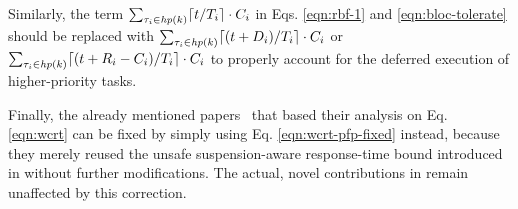 Similarly, the term $\sum_{\tau_i \in \mathit{hp}(k)} \lceil t / T_i \rceil \cdot C_i$ in Eqs. \eqref{eqn:rbf-1} and \eqref{eqn:bloc-tolerate} should be replaced with $\sum_{\tau_i \in \mathit{hp}(k)} \lceil (t+D_i) / T_i \rceil \cdot C_i$ or $\sum_{\tau_i \in \mathit{hp}(k)} \lceil (t+R_i-C_i) / T_i \rceil \cdot C_i$ to properly account for the deferred execution of higher-priority tasks.

Finally, the already mentioned papers~\cite{zeng-2011,bbb-2013,yang-2013,kim-2014,han-2014,carminati-2014,yang-2014} that based their analysis on Eq. \eqref{eqn:wcrt} can be fixed by simply using Eq. \eqref{eqn:wcrt-pfp-fixed} instead, because they merely reused the unsafe suspension-aware response-time bound introduced in \cite{lakshmanan-2009} without further modifications. The actual, novel contributions in \cite{zeng-2011,bbb-2013,yang-2013,kim-2014,han-2014,carminati-2014,yang-2014} remain unaffected by this correction.
  
  




  